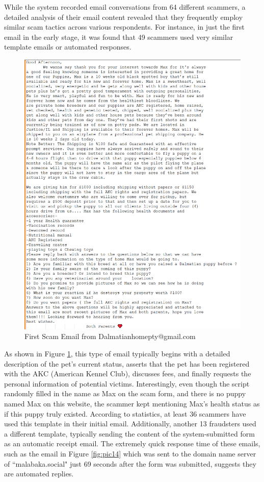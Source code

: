 \documentclass[ oneside,%
                    author={Cassie Qing Tang},
                    degree={BSc},
                     title={An Automated Response System for Disrupting Online Pet Scamming \\ },
                    subtitle={ }]{dissertation}
\begin{document}
While the system recorded email conversations from 64 different scammers, a detailed analysis of their email content revealed that they frequently employ similar scam tactics across various respondents. For instance, in just the first email in the early stage, it was found that 49 scammers used very similar template emails or automated responses.
\begin{figure}[H]
\centering
\includegraphics[width=0.7\linewidth]{pic/figure13.png}
\caption{First Scam Email from Dalmatianhomepty@gmail.com}
\label{fig:pic13}
\end{figure}
As shown in Figure \ref{fig:pic13}, this type of email typically begins with a detailed description of the pet's current status, asserts that the pet has been registered with the AKC (American Kennel Club), discusses fees, and finally requests the personal information of potential victims. Interestingly, even though the script randomly filled in the name as Max on the scam form, and there is no puppy named Max on this website, the scammer kept mentioning Max's health status as if this puppy truly existed. According to statistics, at least 36 scammers have used this template in their initial email. Additionally, another 13 fraudsters used a different template, typically sending the content of the system-submitted form as an automatic receipt email. The extremely quick response time of these emails, such as the email in Figure \ref{fig:pic14} which was sent to the domain name server of ``malabaka.social" just 69 seconds after the form was submitted, suggests they are automated replies.
\end{document}
